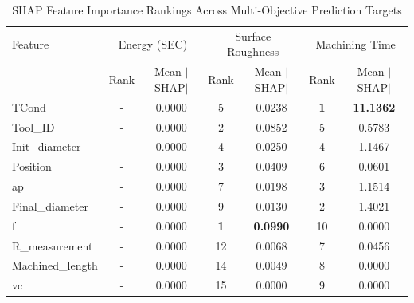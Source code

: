 \begin{table}[htbp]
\centering
\caption{SHAP Feature Importance Rankings Across Multi-Objective Prediction Targets}
\label{tab:shap_importance}
\begin{tabular}{lcccccc}
\hline
Feature & \multicolumn{2}{c}{Energy (SEC)} & \multicolumn{2}{c}{Surface Roughness} & \multicolumn{2}{c}{Machining Time} \\
 & Rank & Mean $|$SHAP$|$ & Rank & Mean $|$SHAP$|$ & Rank & Mean $|$SHAP$|$ \\
\hline
TCond & - & 0.0000 & 5 & 0.0238 & \textbf{1} & \textbf{11.1362} \\
Tool\_ID & - & 0.0000 & 2 & 0.0852 & 5 & 0.5783 \\
Init\_diameter & - & 0.0000 & 4 & 0.0250 & 4 & 1.1467 \\
Position & - & 0.0000 & 3 & 0.0409 & 6 & 0.0601 \\
ap & - & 0.0000 & 7 & 0.0198 & 3 & 1.1514 \\
Final\_diameter & - & 0.0000 & 9 & 0.0130 & 2 & 1.4021 \\
f & - & 0.0000 & \textbf{1} & \textbf{0.0990} & 10 & 0.0000 \\
R\_measurement & - & 0.0000 & 12 & 0.0068 & 7 & 0.0456 \\
Machined\_length & - & 0.0000 & 14 & 0.0049 & 8 & 0.0000 \\
vc & - & 0.0000 & 15 & 0.0000 & 9 & 0.0000 \\
\hline
\end{tabular}
\end{table}